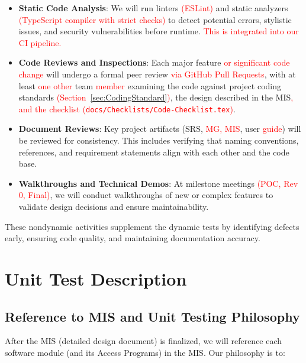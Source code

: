\documentclass[12pt, titlepage]{article}
\begin{document}
\begin{itemize}
    \item \textbf{Static Code Analysis}: We will run linters \textcolor{red}{(ESLint)} and static analyzers \textcolor{red}{(TypeScript compiler with strict checks)} to detect potential errors, stylistic issues, and security vulnerabilities before runtime. \textcolor{red}{This is integrated into our CI pipeline.}
    \item \textbf{Code Reviews and Inspections}: Each major feature \textcolor{red}{or significant code change} will undergo a formal peer review \textcolor{red}{via GitHub Pull Requests}, with at least \textcolor{red}{one other} team \textcolor{red}{member} examining the code against project coding standards \textcolor{red}{(Section~\ref{sec:CodingStandard})}, the design described in the MIS\textcolor{red}{, and the checklist (\texttt{docs/Checklists/Code-Checklist.tex})}.
    \item \textbf{Document Reviews}: Key project artifacts (SRS, \textcolor{red}{MG, MIS}, user \textcolor{red}{guide}) will be reviewed for consistency. This includes verifying that naming conventions, references, and requirement statements align with each other and the code base.
    \item \textbf{Walkthroughs and Technical Demos}: At milestone meetings \textcolor{red}{(POC, Rev 0, Final)}, we will conduct walkthroughs of new or complex features to validate design decisions and ensure maintainability.
\end{itemize}

These nondynamic activities supplement the dynamic tests by identifying defects early, ensuring code quality, and maintaining documentation accuracy.

\section{Unit Test Description} \label{sec:UnitTests}

\subsection{Reference to MIS and Unit Testing Philosophy}
After the MIS (detailed design document) is finalized, we will reference each software module (and its Access Programs) in the MIS. Our philosophy is to:
\end{document}
